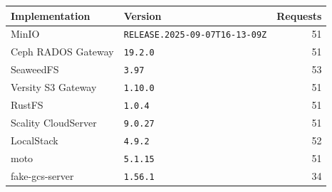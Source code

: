 \begin{tabular}{@{}llr@{}}
\toprule
Implementation & Version & Requests \\
\midrule
MinIO & \texttt{RELEASE.2025-09-07T16-13-09Z} & 51 \\
Ceph RADOS Gateway & \texttt{19.2.0} & 51 \\
SeaweedFS & \texttt{3.97} & 53 \\
Versity S3 Gateway & \texttt{1.10.0} & 51 \\
RustFS & \texttt{1.0.4} & 51 \\
Scality CloudServer & \texttt{9.0.27} & 51 \\
LocalStack & \texttt{4.9.2} & 52 \\
moto & \texttt{5.1.15} & 51 \\
fake-gcs-server & \texttt{1.56.1} & 34 \\
\bottomrule
\end{tabular}
